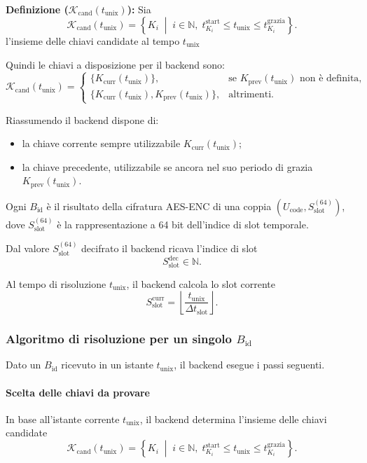 \documentclass[a4paper,11pt]{article}
\begin{document}
\textbf{Definizione (\(\mathcal{K}_{\mathrm{cand}}(t_{\text{unix}})\)):} Sia
\[
  \mathcal{K}_{\mathrm{cand}}(t_{\text{unix}})
  = \left\{
  K_i \;\middle|\;
  i \in \mathbb{N},\;
  t_{K_i}^{\text{start}} \le t_{\text{unix}} \le t_{K_i}^{\text{grazia}}
  \right\}.
\]
l'insieme delle chiavi candidate al tempo \(t_{\text{unix}}\)

Quindi le chiavi a disposizione per il backend sono:
\[
  \mathcal{K}_{\mathrm{cand}}(t_{\text{unix}}) =
  \begin{cases}
    \{K_{\text{curr}}(t_{\text{unix}})\},                                   &
    \text{se \(K_{\text{prev}}(t_{\text{unix}})\) non è definita},            \\[4pt]
    \{K_{\text{curr}}(t_{\text{unix}}), K_{\text{prev}}(t_{\text{unix}})\}, &
    \text{altrimenti}.
  \end{cases}
\]

Riassumendo il backend dispone di:
\begin{itemize}
  \item la chiave corrente sempre utilizzabile \(K_{\text{curr}}(t_{\text{unix}})\);
  \item la chiave precedente, utilizzabile se ancora nel suo periodo di grazia \(K_{\text{prev}}(t_{\text{unix}})\).
\end{itemize}

Ogni \(B_{\text{id}}\) è il risultato della cifratura AES-ENC di una coppia
\((U_{\text{code}}, S_{\text{slot}}^{(64)})\), dove \(S_{\text{slot}}^{(64)}\) è la
rappresentazione a 64 bit dell'indice di slot temporale.

Dal valore \(S_{\text{slot}}^{(64)}\) decifrato il backend ricava l'indice di slot
\[
  S_{\text{slot}}^{\text{dec}} \in \mathbb{N}.
\]

Al tempo di risoluzione \(t_{\text{unix}}\), il backend calcola lo slot corrente
\[
  S_{\text{slot}}^{\text{curr}}
  = \left\lfloor \frac{t_{\text{unix}}}{\Delta t_{\text{slot}}} \right\rfloor.
\]


\subsubsection{Algoritmo di risoluzione per un singolo $B_{\text{id}}$}
Dato un \(B_{\text{id}}\) ricevuto in un istante \(t_{\text{unix}}\), il backend esegue i passi seguenti.

\paragraph{Scelta delle chiavi da provare}
In base all'istante corrente \(t_{\text{unix}}\), il backend determina l'insieme delle chiavi candidate
\[
  \mathcal{K}_{\mathrm{cand}}(t_{\text{unix}})
  = \left\{
  K_i \;\middle|\;
  i \in \mathbb{N},\;
  t_{K_i}^{\text{start}} \le t_{\text{unix}} \le t_{K_i}^{\text{grazia}}
  \right\}.
\]
\end{document}
